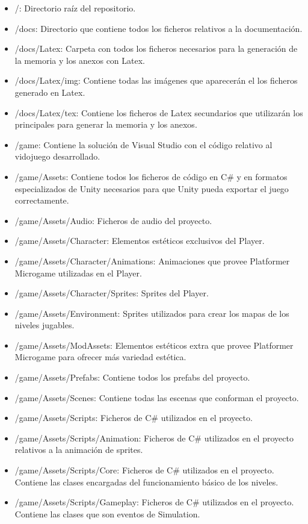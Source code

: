 \begin{itemize}
\item
/: Directorio raíz del repositorio.
\item
/docs: Directorio que contiene todos los ficheros relativos a la documentación.
\item
/docs/Latex: Carpeta con todos los ficheros necesarios para la generación de la memoria y los anexos con Latex.
\item
/docs/Latex/img: Contiene todas las imágenes que aparecerán el los ficheros generado en Latex.
\item
/docs/Latex/tex: Contiene los ficheros de Latex secundarios que utilizarán los principales para generar la memoria y los anexos.
\item
/game: Contiene la solución de Visual Studio con el código relativo al vidojuego desarrollado.
\item
/game/Assets: Contiene todos los ficheros de código en C\# y en formatos especializados de Unity necesarios para que Unity pueda exportar el juego correctamente.
\item
/game/Assets/Audio: Ficheros de audio del proyecto.
\item
/game/Assets/Character: Elementos estéticos exclusivos del Player.
\item
/game/Assets/Character/Animations: Animaciones que provee Platformer Microgame utilizadas en el Player.
\item
/game/Assets/Character/Sprites: Sprites del Player.
\item
/game/Assets/Environment: Sprites utilizados para crear los mapas de los niveles jugables.
\item
/game/Assets/ModAssets: Elementos estéticos extra que provee Platformer Microgame para ofrecer más variedad estética.
\item
/game/Assets/Prefabs: Contiene todos los prefabs del proyecto.
\item
/game/Assets/Scenes: Contiene todas las escenas que conforman el proyecto.
\item
/game/Assets/Scripts: Ficheros de C\# utilizados en el proyecto.
\item
/game/Assets/Scripts/Animation: Ficheros de C\# utilizados en el proyecto relativos a la animación de sprites.
\item
/game/Assets/Scripts/Core: Ficheros de C\# utilizados en el proyecto. Contiene las clases encargadas del funcionamiento básico de los niveles.
\item
/game/Assets/Scripts/Gameplay: Ficheros de C\# utilizados en el proyecto. Contiene las clases que son eventos de Simulation.

\end{itemize}

